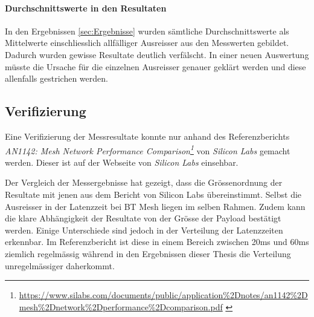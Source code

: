 \paragraph{Durchschnittswerte in den Resultaten}
In den Ergebnissen \ref{sec:Ergebnisse} wurden sämtliche Durchschnittswerte als Mittelwerte einschliesslich allfälliger Ausreisser aus den Messwerten gebildet.
Dadurch wurden gewisse Resultate deutlich verfälscht.
In einer neuen Auswertung müsste die Ursache für die einzelnen Ausreisser genauer geklärt werden und diese allenfalls gestrichen werden.


\subsection{Verifizierung}\label{subsec:Verifizierung}
Eine Verifizierung der Messresultate konnte nur anhand des Referenzberichts \textit{AN1142: Mesh Network Performance
	Comparison\footnote{\url{https://www.silabs.com/documents/public/application\%2Dnotes/an1142\%2Dmesh\%2Dnetwork\%2Dperformance\%2Dcomparison.pdf} \cite{silicon_laboratories_inc_an1142_2020}}} von \textit{Silicon Labs} gemacht werden.
Dieser ist auf der Webseite von \textit{Silicon Labs} einsehbar.

Der Vergleich der Messergebnisse hat gezeigt, dass die Grössenordnung der Resultate mit jenen aus dem Bericht von Silicon Labs übereinstimmt.
Selbst die Ausreisser in der Latenzzeit bei BT Mesh liegen im selben Rahmen.
Zudem kann die klare Abhängigkeit der Resultate von der Grösse der Payload bestätigt werden.
Einige Unterschiede sind jedoch in der Verteilung der Latenzzeiten erkennbar.
Im Referenzbericht ist diese in einem Bereich zwischen 20ms und 60ms ziemlich regelmässig während in den Ergebnissen dieser Thesis die Verteilung unregelmässiger daherkommt.
